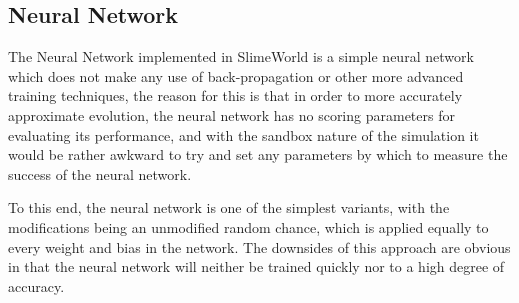 \subsection{Neural Network}
The Neural Network implemented in SlimeWorld is a simple neural network which does not make any use of back-propagation or other more advanced training techniques, the reason for this is that in order to more accurately approximate evolution, the neural network has no scoring parameters for evaluating its performance, and with the sandbox nature of the simulation it would be rather awkward to try and set any parameters by which to measure the success of the neural network. 
\par
To this end, the neural network is one of the simplest variants, with the modifications being an unmodified random chance, which is applied equally to every weight and bias in the network. The downsides of this approach are obvious in that the neural network will neither be trained quickly nor to a high degree of accuracy.

